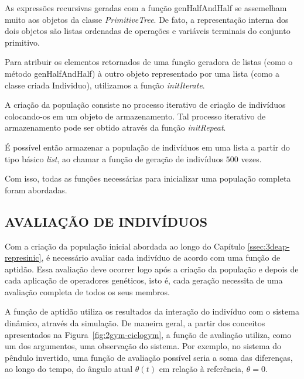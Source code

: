 As expressões recursivas geradas com a função genHalfAndHalf se assemelham muito aos objetos da classe \textit{PrimitiveTree}. De fato, a representação interna dos dois objetos são listas ordenadas de operações e variáveis terminais do conjunto primitivo.

Para atribuir os elementos retornados de uma função geradora de listas (como o método genHalfAndHalf) à outro objeto representado por uma lista (como a classe criada Individuo), utilizamos a função \textit{initIterate}.


A criação da população consiste no processo iterativo de criação de indivíduos colocando-os em um objeto de
armazenamento. Tal processo iterativo de armazenamento pode ser obtido através da função \textit{initRepeat}.


É possível então armazenar a população de indivíduos em uma lista a partir do tipo básico \textit{list},
ao chamar a função de geração de indivíduos $500$ vezes.

Com isso, todas as funções necessárias para inicializar uma população completa foram abordadas. 

\subsection{AVALIAÇÃO DE INDIVÍDUOS}\label{ssec:3deap-avalind}

Com a criação da população inicial abordada ao longo do Capítulo \ref{ssec:3deap-represinic}, é necessário avaliar cada indivíduo de acordo com uma função de aptidão. Essa avaliação deve ocorrer logo após a criação da população e depois de cada aplicação de operadores genéticos, isto é, cada geração necessita de uma avaliação completa de todos os seus membros.

A função de aptidão utiliza os resultados da interação do indivíduo com o sistema dinâmico, através da simulação. De maneira geral, a partir dos conceitos apresentados na Figura~\ref{fig:2gym-ciclogym}, a função de avaliação utiliza, como um dos argumentos, uma observação do sistema. Por exemplo, no sistema do pêndulo invertido, uma função de avaliação possível seria a soma das diferenças, ao longo do tempo, do ângulo atual $\theta(t)$ em relação à referência, $\theta=0$.

